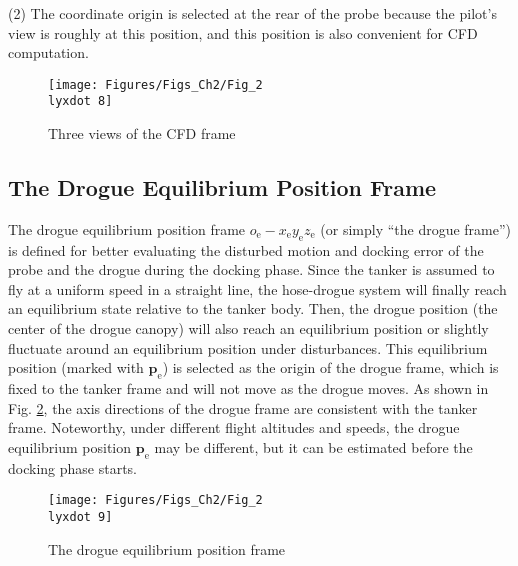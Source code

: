 (2) The coordinate origin is selected at the rear of the probe because
the pilot's view is roughly at this position, and this position is
also convenient for CFD computation.

\begin{figure}
	\begin{centering}
		\texttt{[image: Figures/Figs\_Ch2/Fig\_2\\lyxdot 8]}
		\par\end{centering}
	\caption{Three views of the CFD frame}
	
	\centering{}\label{Fig_2.8}
\end{figure}


\subsection{The Drogue Equilibrium Position Frame}

The drogue equilibrium position frame ${{o}_{\text{e}}}-{{x}_{\text{e}}}{{y}_{\text{e}}}{{z}_{\text{e}}}$
(or simply \textquotedblleft the drogue frame\textquotedblright )
is defined for better evaluating the disturbed motion and docking
error of the probe and the drogue during the docking phase. Since
the tanker is assumed to fly at a uniform speed in a straight line,
the hose-drogue system will finally reach an equilibrium state relative
to the tanker body. Then, the drogue position (the center of the drogue
canopy) will also reach an equilibrium position or slightly fluctuate
around an equilibrium position under disturbances. This equilibrium
position (marked with ${{\mathbf{p}}_{\text{e}}}$) is selected as
the origin of the drogue frame, which is fixed to the tanker frame
and will not move as the drogue moves. As shown in Fig. \ref{Fig_2.9},
the axis directions of the drogue frame are consistent with the tanker
frame. Noteworthy, under different flight altitudes and speeds, the
drogue equilibrium position ${{\mathbf{p}}_{\text{e}}}$ may be different,
but it can be estimated before the docking phase starts.

\begin{figure}
	\begin{centering}
		\texttt{[image: Figures/Figs\_Ch2/Fig\_2\\lyxdot 9]}
		\par\end{centering}
	\caption{The drogue equilibrium position frame}
	
	\centering{}\label{Fig_2.9}
\end{figure}


